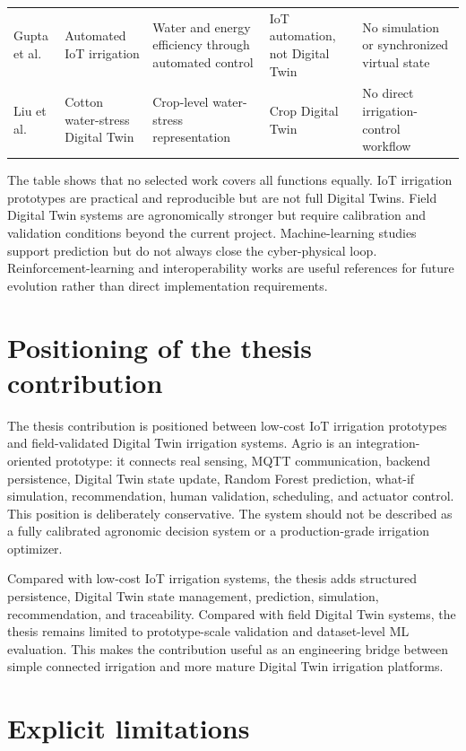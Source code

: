 \begin{footnotesize}
\begin{longtable}{@{}p{}p{}p{}p{}p{}@{}}
Gupta et al. \cite{gupta2025iotirrigation} & Automated IoT irrigation & Water and energy efficiency through automated control & IoT automation, not Digital Twin & No simulation or synchronized virtual state \\
Liu et al. \cite{liu2025cottondt} & Cotton water-stress Digital Twin & Crop-level water-stress representation & Crop Digital Twin & No direct irrigation-control workflow \\
\bottomrule
\end{longtable}
\end{footnotesize}

The table shows that no selected work covers all functions equally. IoT irrigation prototypes are practical and reproducible but are not full Digital Twins. Field Digital Twin systems are agronomically stronger but require calibration and validation conditions beyond the current project. Machine-learning studies support prediction but do not always close the cyber-physical loop. Reinforcement-learning and interoperability works are useful references for future evolution rather than direct implementation requirements.

\section{Positioning of the thesis contribution}

The thesis contribution is positioned between low-cost IoT irrigation prototypes and field-validated Digital Twin irrigation systems. Agrio is an integration-oriented prototype: it connects real sensing, MQTT communication, backend persistence, Digital Twin state update, Random Forest prediction, what-if simulation, recommendation, human validation, scheduling, and actuator control. This position is deliberately conservative. The system should not be described as a fully calibrated agronomic decision system or a production-grade irrigation optimizer.

Compared with low-cost IoT irrigation systems, the thesis adds structured persistence, Digital Twin state management, prediction, simulation, recommendation, and traceability. Compared with field Digital Twin systems, the thesis remains limited to prototype-scale validation and dataset-level ML evaluation. This makes the contribution useful as an engineering bridge between simple connected irrigation and more mature Digital Twin irrigation platforms.

\section{Explicit limitations}

